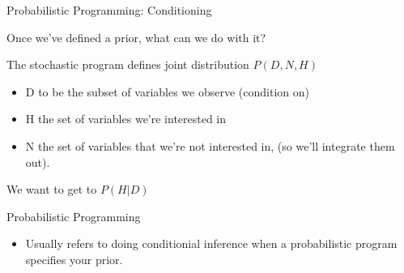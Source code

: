 \begin{frame}{Probabilistic Programming: Conditioning}
  \begin{block}{Once we've defined a prior, what can we do with it?}  

  The stochastic program defines joint distribution $P(D,N,H)$
  \begin{itemize}
    \item D to be the subset of variables we observe (condition on)
    \item H the set of variables we're interested in
    \item N the set of variables that we're not interested in, (so we'll integrate them out).
  \end{itemize}
  We want to get to $P(H|D)$
  \end{block}
  \begin{block}{Probabilistic Programming}
      \begin{itemize}
        \item Usually refers to doing conditionial inference when a probabilistic program specifies your prior.
      \end{itemize}
    \end{block}
\end{frame}

